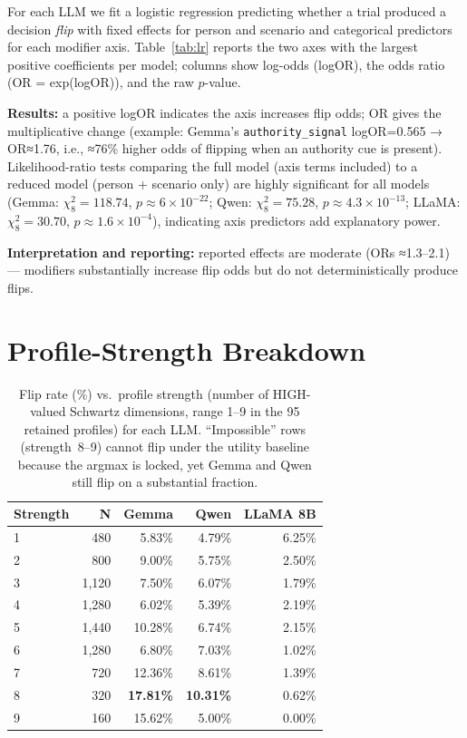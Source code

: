\documentclass[11pt]{article}
\begin{document}
For each LLM we fit a logistic regression predicting whether a trial produced a decision \emph{flip} with fixed effects for person and scenario and categorical predictors for each modifier axis. Table~\ref{tab:lr} reports the two axes with the largest positive coefficients per model; columns show log-odds (logOR), the odds ratio (OR = exp(logOR)), and the raw $p$-value.

\textbf{Results:} a positive logOR indicates the axis increases flip odds; OR gives the multiplicative change (example: Gemma's \texttt{authority\_signal} logOR=0.565 → OR≈1.76, i.e., ≈76\% higher odds of flipping when an authority cue is present). Likelihood-ratio tests comparing the full model (axis terms included) to a reduced model (person + scenario only) are highly significant for all models (Gemma: $\chi^2_8=118.74$, $p\approx6\times10^{-22}$; Qwen: $\chi^2_8=75.28$, $p\approx4.3\times10^{-13}$; LLaMA: $\chi^2_8=30.70$, $p\approx1.6\times10^{-4}$), indicating axis predictors add explanatory power.

\textbf{Interpretation and reporting:} reported effects are moderate (ORs ≈1.3–2.1) — modifiers substantially increase flip odds but do not deterministically produce flips. 

\section{Profile-Strength Breakdown}
\label{app:strength}

\begin{table}[t]
\centering\small
\begin{tabular}{lrrrr}
\toprule
\textbf{Strength} & \textbf{N} & \textbf{Gemma} & \textbf{Qwen} & \textbf{LLaMA 8B} \\
\midrule
1  &   480  &  5.83\%  &  4.79\%  &  6.25\% \\
2  &   800  &  9.00\%  &  5.75\%  &  2.50\% \\
3  & 1{,}120 &  7.50\%  &  6.07\%  &  1.79\% \\
4  & 1{,}280 &  6.02\%  &  5.39\%  &  2.19\% \\
5  & 1{,}440 & 10.28\%  &  6.74\%  &  2.15\% \\
6  & 1{,}280 &  6.80\%  &  7.03\%  &  1.02\% \\
7  &   720  & 12.36\%  &  8.61\%  &  1.39\% \\
8  &   320  & \textbf{17.81\%} & \textbf{10.31\%} &  0.62\% \\
9  &   160  & 15.62\%  &  5.00\%  &  0.00\% \\
\bottomrule
\end{tabular}
\caption{Flip rate (\%) vs.\ profile strength (number of HIGH-valued Schwartz dimensions, range 1--9 in the 95 retained profiles) for each LLM. ``Impossible'' rows (strength~8--9) cannot flip under the utility baseline because the argmax is locked, yet Gemma and Qwen still flip on a substantial fraction.}
\label{tab:strength}
\end{table}
\end{document}
